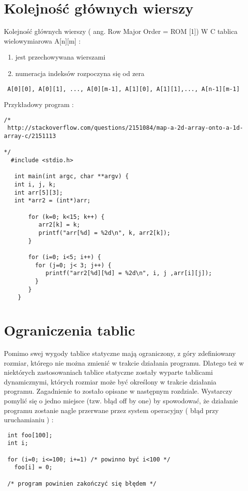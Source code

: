 \documentclass[11pt,a4paper]{article}
\begin{document}
\section*{Kolejność głównych wierszy}
Kolejność głównych wierszy ( ang. Row Major Order = ROM [1])
W C tablica wielowymiarowa A[n][m] :
\begin{enumerate}
\item jest przechowywana wierszami
\item numeracja indeksów rozpoczyna się od zera
\end{enumerate}
\begin{lstlisting}
 A[0][0], A[0][1], ..., A[0][m-1], A[1][0], A[1][1],..., A[n-1][m-1] 
\end{lstlisting}
Przykładowy program :
\begin{lstlisting}
/*
 http://stackoverflow.com/questions/2151084/map-a-2d-array-onto-a-1d-array-c/2151113

*/
  #include <stdio.h>

   int main(int argc, char **argv) {
   int i, j, k;
   int arr[5][3];
   int *arr2 = (int*)arr;

       for (k=0; k<15; k++) {
          arr2[k] = k;
          printf("arr[%d] = %2d\n", k, arr2[k]);
       }

       for (i=0; i<5; i++) {
         for (j=0; j< 3; j++) {
            printf("arr2[%d][%d] = %2d\n", i, j ,arr[i][j]);
         }
       } 
    }
\end{lstlisting}
\section*{Ograniczenia tablic}
Pomimo swej wygody tablice statyczne mają ograniczony, z góry zdefiniowany rozmiar, którego nie można zmienić w trakcie działania programu. Dlatego też w niektórych zastosowaniach tablice statyczne zostały wyparte tablicami dynamicznymi, których rozmiar może być określony w trakcie działania programu. Zagadnienie to zostało opisane w następnym rozdziale.
Wystarczy pomylić się o jedno miejsce (tzw. błąd off by one) by spowodować, że działanie programu zostanie nagle przerwane przez system operacyjny ( błąd przy uruchamianiu ) :
\begin{lstlisting}
 int foo[100];
 int i;
 
 for (i=0; i<=100; i+=1) /* powinno być i<100 */
   foo[i] = 0;

 /* program powinien zakończyć się błędem */

\end{lstlisting}
\end{document}
